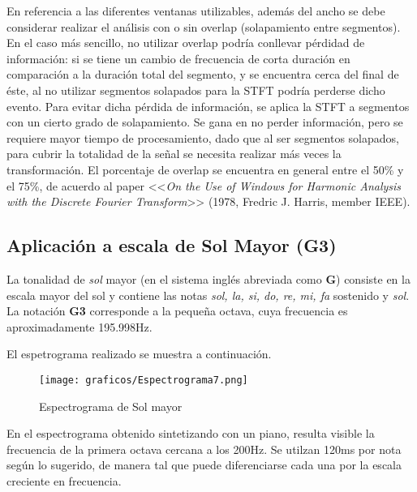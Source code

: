 \documentclass[e2_tp1_main.tex]{subfiles}
\begin{document}
En referencia a las diferentes ventanas utilizables, adem\'as del ancho se debe considerar realizar el an\'alisis con o sin overlap (solapamiento entre segmentos). En el caso m\'as sencillo, no utilizar overlap podr\'ia conllevar p\'erdidad de informaci\'on: si se tiene un cambio de frecuencia de corta duraci\'on en comparaci\'on a la duraci\'on total del segmento, y se encuentra cerca del final de \'este, al no utilizar segmentos solapados para la STFT podr\'ia perderse dicho evento. Para evitar dicha p\'erdida de informaci\'on, se aplica la STFT a segmentos con un cierto grado de solapamiento. Se gana en no perder informaci\'on, pero se requiere mayor tiempo de procesamiento, dado que al ser segmentos solapados, para cubrir la totalidad de la se\~nal se necesita realizar m\'as veces la transformaci\'on. El porcentaje de overlap se encuentra en general entre el 50\% y el 75\%, de acuerdo al paper <<\textit{On the Use of Windows for Harmonic Analysis with the Discrete Fourier Transform}>> (1978, Fredric J. Harris, member IEEE).

\subsection{Aplicaci\'on a escala de Sol Mayor (G3)}

La tonalidad de \textit{sol} mayor (en el sistema ingl\'es abreviada como \textbf{G}) consiste en la escala mayor del sol y contiene las notas \textit{sol, la, si, do, re, mi, fa} sostenido y \textit{sol}. La notaci\'on \textbf{G3} corresponde a la peque\~na octava, cuya frecuencia es aproximadamente 195.998Hz.\par
El espetrograma realizado se muestra a continuaci\'on.

\begin{figure}[ht]	
\begin{centering}
	\texttt{[image: graficos/Espectrograma7.png]}
	\caption{Espectrograma de Sol mayor}
	\end{centering}\par
\end{figure}

En el espectrograma obtenido sintetizando con un piano, resulta visible la frecuencia de la primera octava cercana a los 200Hz. Se utilzan 120ms por nota seg\'un lo sugerido, de manera tal que puede diferenciarse cada una por la escala creciente en frecuencia.
\end{document}
